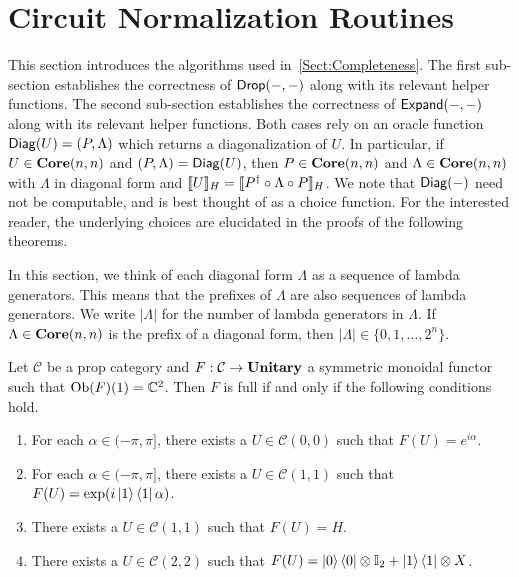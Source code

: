 \section{Circuit Normalization Routines}
%
\label{App:Routines}

This section introduces the algorithms used in~\cref{Sect:Completeness}.
The first sub-section establishes the correctness of $\mathsf{Drop}( -, - )$ along with its relevant helper functions.
The second sub-section establishes the correctness of $\mathsf{Expand}( -, - )$ along with its relevant helper functions.
Both cases rely on an oracle function $\mathsf{Diag}( U ) = ( P, \Lambda )$ which returns a diagonalization of $U$.
In particular, if $U \in \mathbf{Core}( n, n )$ and $( P, \Lambda ) = \mathsf{Diag}( U )$, then $P \in \mathbf{Core}( n, n )$ and $\Lambda \in \mathbf{Core}( n, n )$ with $\Lambda$ in diagonal form and $\llbracket U\rrbracket_H = \llbracket P^\dagger \circ \Lambda \circ P\rrbracket_H$.
We note that $\mathsf{Diag}( - )$ need not be computable, and is best thought of as a choice function.
For the interested reader, the underlying choices are elucidated in the proofs of the following theorems.

\begin{remark}
    In this section, we think of each diagonal form $\Lambda$ as a sequence of lambda generators.
    This means that the prefixes of $\Lambda$ are also sequences of lambda generators.
    We write $|\Lambda|$ for the number of lambda generators in $\Lambda$.
    If $\Lambda \in \mathbf{Core}( n, n )$ is the prefix of a diagonal form, then $|\Lambda| \in \{ 0, 1, \ldots, 2^n \}$.
\end{remark}

\begin{proposition}
    \label{Prop:Full}
    Let $\mathcal{C}$ be a prop category and $F: \mathcal{C} \to \mathbf{Unitary}$ a symmetric monoidal functor such that $\operatorname{Ob}( F )( 1 ) = \mathbb{C}^2$.
    Then $F$ is full if and only if the following conditions hold.
    \begin{enumerate}
    \item For each $\alpha \in (-\pi, \pi]$, there exists a $U \in \mathcal{C}( 0, 0 )$ such that $F( U ) = e^{i\alpha}$.
    \item For each $\alpha \in (-\pi, \pi]$, there exists a $U \in \mathcal{C}( 1, 1 )$ such that $F( U ) = \exp( i \ket{1}\bra{1} \alpha )$.
    \item There exists a $U \in \mathcal{C}( 1, 1 )$ such that $F( U ) = H$.
    \item There exists a $U \in \mathcal{C}( 2, 2 )$ such that $F( U ) = \ket{0} \bra{0} \otimes \mathbb{I}_2 + \ket{1} \bra{1} \otimes X$.
    \end{enumerate}
\end{proposition}

